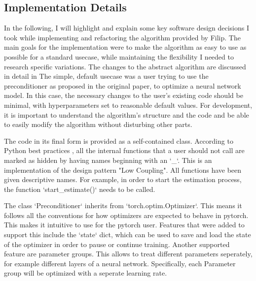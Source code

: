 \documentclass[twoside,12pt,a4paper]{report}
\begin{document}
\subsection{Implementation Details}
\begin{markdown}
In the following, I will highlight and explain some key software design decisions I took while implementing and refactoring the algorithm provided by Filip.
The main goals for the implementation were to make the algorithm as easy to use as possible for a standard usecase, while maintaining the flexibility I needed to research specific variations. The changes to the abstract algorithm are discussed in detail in  The simple, default usecase was a user trying to use the preconditioner as proposed in the original paper, to optimize a neural network model. In this case, the necessary changes to the user's existing code should be minimal, with hyperparameters set to reasonable default values. For development, it is important to understand the algorithm's structure and the code and be able to easily modify the algorithm without disturbing other parts.

The code in its final form is provided as a self-contained class. According to Python best practices , all the internal functions that a user should not call are marked as hidden by having names beginning with an `_`. This is an implementation of the design pattern "Low Coupling". All functions have been given descriptive names. For example, in order to start the estimation process, the function `start_estimate()` needs to be called.

The class `Preconditioner` inherits from `torch.optim.Optimizer`. This means it follows all the conventions for how optimizers are expected to behave in pytorch. This makes it intuitive to use for the pytorch user. Features that were added to support this include the `state` dict, which can be used to save and load the state of the optimizer in order to pause or continue training. Another supported feature are parameter groups. This allows to treat different parameters seperately, for example different layers of a neural network. Specifically, each Parameter group will be optimized with a seperate learning rate.


\end{markdown}
\end{document}
